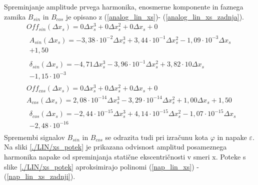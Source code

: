 Spreminjanje amplitude prvega harmonika, enosmerne komponente in faznega zamika $B_{sin}$ in $B_{cos}$ je opisano z (\ref{analog_lin_xs})- (\ref{analog_lin_xs_zadnja}). 
\begin{eqnarray}
\label{analog_lin_xs}
&Off_{sin}(\Delta x_s) = 0\Delta x_s^{3}+0\Delta x_s^{2}+0\Delta x_s+0 \\       
&\begin{split}A_{sin}(\Delta x_s) =-3,38\cdot 10^{-2}\Delta x_s^{3}+3,44\cdot 10^{-1}\Delta x_s^{2}-1,09\cdot 10^{-3}\Delta x_s\\+1,50 \end{split}\\                      
& \begin{split}\delta_{sin}(\Delta x_s) =-4,71\Delta x_s^{3}-3,96\cdot 10^{-1}\Delta x_s^{2}+3,82\cdot 10\Delta x_s\\-1,15\cdot 10^{-3}  \end{split}\\                             
&Off_{cos}(\Delta x_s) = 0\Delta x_s^{3}+0\Delta x_s^{2}+0\Delta x_s+0 \\       
&A_{cos}(\Delta x_s) =2,08\cdot 10^{-14}\Delta x_s^{3}-3,29\cdot 10^{-14}\Delta x_s^{2}+1,00\Delta x_s+1,50 \\ 
\label{analog_lin_xs_zadnja}                              
&\begin{split}\delta_{cos}(\Delta x_s) =-2,44\cdot 10^{-15}\Delta x_s^{3}+4,14\cdot 10^{-15}\Delta x_s^{2}-1,07\cdot 10^{-15}\Delta x_s\\-2,48\cdot 10^{-16} \end{split}
\end{eqnarray}
\newpage
Spremembi signalov $B_{sin}$ in $B_{cos}$ se odrazita tudi pri izračunu kota $\varphi$ in napake $\varepsilon$.
Na sliki \ref{./LIN/xs_potek} je prikazana odvisnost amplitud posameznega harmonika napake od spreminjanja statične ekscentričnosti v smeri x. Poteke s slike \ref{./LIN/xs_potek} aproksimirajo polinomi (\ref{nap_lin_xs}) - (\ref{nap_lin_xs_zadnji}).
